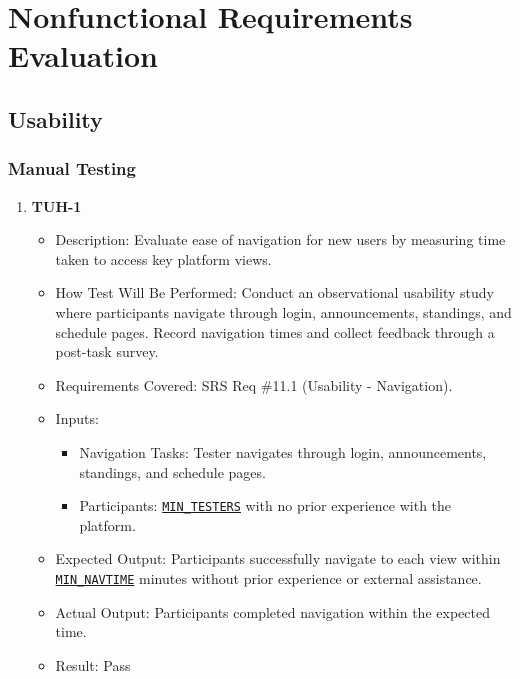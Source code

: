 \documentclass[12pt, titlepage]{article}
\begin{document}
\section{Nonfunctional Requirements Evaluation}

\subsection{Usability}

\subsubsection{Manual Testing}
\begin{enumerate}
\item \textbf{TUH-1}  
      \begin{itemize}
          \item Description: Evaluate ease of navigation for new users by measuring time taken to access key platform views.
          \item How Test Will Be Performed: Conduct an observational usability study where participants navigate through login, announcements, standings, and schedule pages. Record navigation times and collect feedback through a post-task survey.
          \item Requirements Covered: SRS Req \#11.1 (Usability - Navigation).
          \item Inputs:  
              \begin{itemize}
                  \item Navigation Tasks: Tester navigates through login, announcements, standings, and schedule pages.
                  \item Participants: \hyperref[MIN_TESTERS]{\texttt{MIN\_TESTERS}} with no prior experience with the platform.
              \end{itemize}
          \item Expected Output: Participants successfully navigate to each view within \hyperref[MIN_NAVTIME]{\texttt{MIN\_NAVTIME}} minutes without prior experience or external assistance.
          \item Actual Output: Participants completed navigation within the expected time.
          \item Result: Pass
      \end{itemize}


\end{enumerate}
\end{document}
